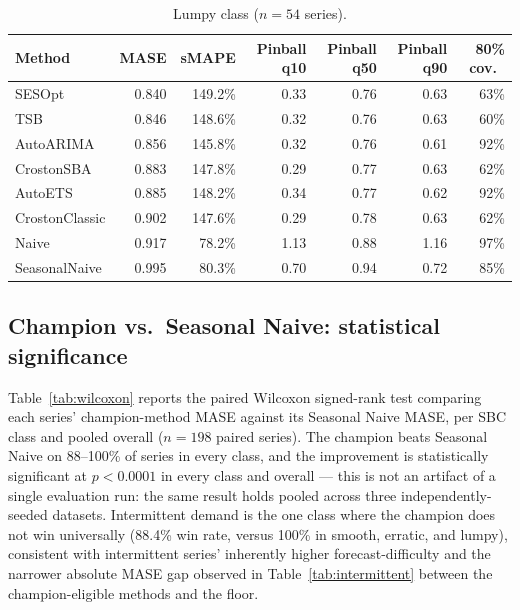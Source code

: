 \documentclass[11pt]{article}
\begin{document}
\begin{table}[htbp]
\centering\footnotesize
\begin{tabular}{lrrrrrr}
\toprule
Method & MASE & sMAPE & Pinball q10 & Pinball q50 & Pinball q90 & 80\% cov.\ \\
\midrule
SESOpt & 0.840 & 149.2\% & 0.33 & 0.76 & 0.63 & 63\% \\
TSB & 0.846 & 148.6\% & 0.32 & 0.76 & 0.63 & 60\% \\
AutoARIMA & 0.856 & 145.8\% & 0.32 & 0.76 & 0.61 & 92\% \\
CrostonSBA & 0.883 & 147.8\% & 0.29 & 0.77 & 0.63 & 62\% \\
AutoETS & 0.885 & 148.2\% & 0.34 & 0.77 & 0.62 & 92\% \\
CrostonClassic & 0.902 & 147.6\% & 0.29 & 0.78 & 0.63 & 62\% \\
Naive & 0.917 & 78.2\% & 1.13 & 0.88 & 1.16 & 97\% \\
SeasonalNaive & 0.995 & 80.3\% & 0.70 & 0.94 & 0.72 & 85\% \\
\bottomrule
\end{tabular}
\caption{Lumpy class ($n = 54$ series).}
\label{tab:lumpy}
\end{table}

\subsection{Champion vs.\ Seasonal Naive: statistical significance}

Table~\ref{tab:wilcoxon} reports the paired Wilcoxon signed-rank test comparing
each series' champion-method MASE against its Seasonal Naive MASE, per SBC class
and pooled overall ($n = 198$ paired series). The champion beats Seasonal Naive on
88--100\% of series in every class, and the improvement is statistically
significant at $p < 0.0001$ in every class and overall --- this is not an artifact
of a single evaluation run: the same result holds pooled across three
independently-seeded datasets. Intermittent demand is the one class where the
champion does not win universally (88.4\% win rate, versus 100\% in smooth,
erratic, and lumpy), consistent with intermittent series' inherently higher
forecast-difficulty and the narrower absolute MASE gap observed in
Table~\ref{tab:intermittent} between the champion-eligible methods and the floor.
\end{document}
